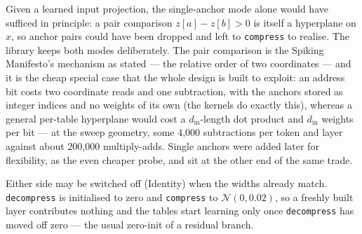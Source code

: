 \documentclass[11pt]{article}
\DeclareRobustCommand{\code}[1]{{\renewcommand{\_}{\textunderscore\allowbreak}\texttt{#1}}}
\begin{document}
Given a learned input projection, the single-anchor mode alone would have sufficed in principle: a pair
comparison $z[a]-z[b]>0$ is itself a hyperplane on $x$, so anchor pairs could have been dropped and left
to \code{compress} to realise. The library keeps both modes deliberately. The pair comparison is the
Spiking Manifesto's mechanism as stated --- the relative order of two coordinates --- and it is the
cheap special case that the whole design is built to exploit: an address bit costs two coordinate reads
and one subtraction, with the anchors stored as integer indices and no weights of its own (the kernels
do exactly this), whereas a general per-table hyperplane would cost a $d_\text{in}$-length dot product and
$d_\text{in}$ weights per bit --- at the sweep geometry, some 4{,}000 subtractions per token and layer
against about 200{,}000 multiply-adds. Single anchors were added later for flexibility, as the even
cheaper probe, and sit at the other end of the same trade.

Either side may be switched off (Identity) when the widths already match. \code{decompress} is initialised
to zero and \code{compress} to $\mathcal{N}(0,0.02)$, so a freshly built layer contributes nothing and the
tables start learning only once \code{decompress} has moved off zero --- the usual zero-init of a residual
branch.
\end{document}
